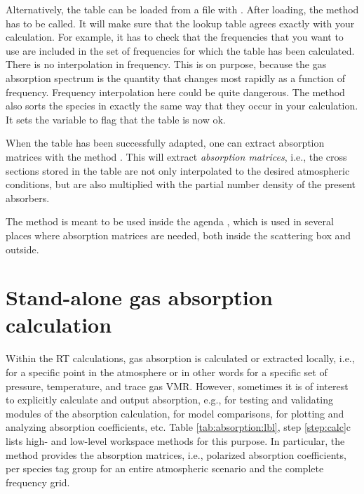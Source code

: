 Alternatively, the table can be loaded from a file with
.  After loading, the method
 has to be called. It will make sure that
the lookup table agrees exactly with your calculation. For example, it
has to check that the frequencies that you want to use are included in
the set of frequencies for which the table has been calculated.  There
is no interpolation in frequency. This is on purpose, because the gas
absorption spectrum is the quantity that changes most rapidly as a
function of frequency. Frequency interpolation here could be quite
dangerous. The  method also sorts the
species in exactly the same way that they occur in your
calculation. It sets the variable 
to flag that the table is now ok. 

When the table has been successfully adapted, one can extract
absorption matrices with the method
. This will extract
\emph{absorption matrices}, i.e., the cross sections stored in the
table are not only interpolated to the desired atmospheric conditions,
but are also multiplied with the partial number density of the present
absorbers.

The  method is meant to
be used inside the agenda ,
which is used in several places where absorption matrices are
needed, both inside the scattering box and outside.

\section{Stand-alone gas absorption calculation}
\label{sec:absorption:abs-only}

Within the RT calculations, gas absorption is calculated or extracted locally,
i.e., for a specific point in the atmosphere or in other words for a specific
set of pressure, temperature, and trace gas VMR. However, sometimes it is of
interest to explicitly calculate and output absorption, e.g., for testing and
validating modules of the absorption calculation,  for model comparisons, for
plotting and analyzing absorption coefficients, etc.
Table \ref{tab:absorption:lbl}, step \ref{step:calc}c lists high- and low-level
workspace methods for this purpose.
In particular, the method  provides the absorption
matrices, i.e., polarized absorption coefficients, per species tag group for
an entire atmospheric scenario and the complete frequency grid.



